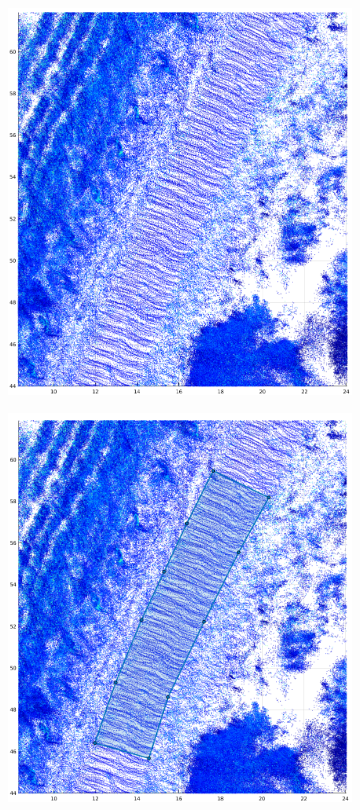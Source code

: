 \documentclass[numbered,pdftex]{ohio-etd}
\begin{document}
{{{{				\begin{figure}[H]
					\centering
					\begin{subfigure}{0.45\textwidth}
						\centering
						\includegraphics[width=1.0\linewidth]{Defense_Images/pre_select_area}
						\caption[Road area on Point Cloud]{}
						\label{fig:pre_select_area}
					\end{subfigure}
					\begin{subfigure}{0.45\textwidth}
						\centering
						\includegraphics[width=1.0\linewidth]{Defense_Images/area_selected}

\end{subfigure}
\end{figure}}}}}
\end{document}

